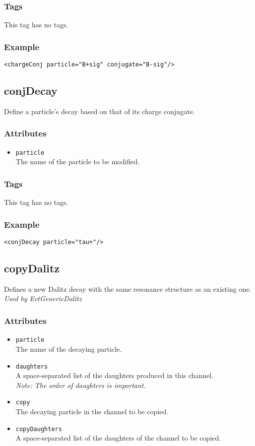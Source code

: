 \subsubsection*{Tags}
This tag has no tags.
\subsubsection*{Example}
{\footnotesize
\begin{verbatim}
<chargeConj particle="B+sig" conjugate="B-sig"/>
\end{verbatim}
}

\subsection{conjDecay}
Define a particle's decay based on that of its charge conjugate.
\subsubsection*{Attributes}
\begin{itemize}
\item{\tt particle}\\
      The name of the particle to be modified.
\end{itemize}
\subsubsection*{Tags}
This tag has no tags.
\subsubsection*{Example}
{\footnotesize
\begin{verbatim}
<conjDecay particle="tau+"/>
\end{verbatim}
}

\subsection{copyDalitz}
Defines a new Dalitz decay with the same resonance structure as an existing one.\\
\emph{Used by EvtGenericDalitz}
\subsubsection*{Attributes}
\begin{itemize}
\item{\tt particle}\\
      The name of the decaying particle.
\item{\tt daughters}\\
      A space-separated list of the daughters produced in this channel.\\
      \emph{Note: The order of daughters is important.}
\item{\tt copy}\\
      The decaying particle in the channel to be copied.
\item{\tt copyDaughters}\\
      A space-separated list of the daughters of the channel to be copied.
\end{itemize}
